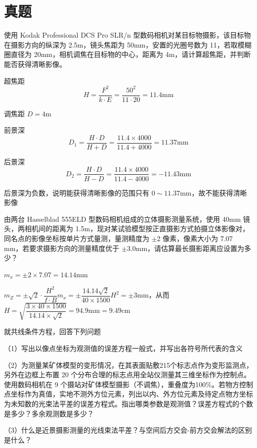 \documentclass[a4paper]{ctexart}
\newtheorem{example}{\hskip 2em 例}
\newtheorem*{sol}{\hskip 2em 解}
\begin{document}
\section*{真题}
\begin{example}
使用 Kodak Professional DCS Pro SLR/n 型数码相机对某目标物摄影，该目标物在摄影方向的纵深为 2.5m，镜头焦距为 50mm，安置的光圈号数为 11，若取模糊圈直径为 20mm，相机调焦在目标物的中心，距离为 4m，请计算超焦距，并判断能否获得清晰影像。
\end{example}
\begin{sol}
超焦距 
$$
H=\frac{F^2}{k\cdot E}=\frac{50^2}{11\cdot 20}=11.4\mathrm{mm}
$$

调焦距 $D=4$m

前景深
$$
D_1=\frac{H\cdot D}{H+D}=\frac{11.4\times 4000}{11.4+4000}=11.37\text{mm}
$$

后景深
$$
D_2=\frac{H\cdot D}{H-D}=\frac{11.4\times 4000}{11.4-4000}=-11.43\text{mm}
$$

后景深为负数，说明能获得清晰影像的范围只有 $0\sim 11.37$mm，故不能获得清晰影像
\end{sol}
\begin{example}
由两台 Hasselblad 555ELD 型数码相机组成的立体摄影测量系统，使用 40mm 镜头，两相机间的距离为 1.5m，现对某试验模型按正直摄影方式拍摄立体影像对，同名点的影像坐标按单片方式量测，量测精度为 $\pm$2 像素，像素大小为 7.07 mm，若要求摄影方向的测量精度优于 $\pm$3.0mm，请估算最长摄影距离应设置为多少？
\end{example}
\begin{sol}
$m_x=\pm 2\times 7.07=14.14$mm

$m_Z=\pm \sqrt{2}\cdot \dfrac{H^2}{f\cdot B}m_x=\pm \dfrac{14.14\sqrt{2}}{40\times 1500}H^2=\pm 3\mathrm{mm}$，从而 $H=\sqrt{\dfrac{3\times 40\times 1500}{14.14\times \sqrt{2}}}=94.9\text{mm}=9.49\text{cm}$
\end{sol}
\begin{example}
\label{ex3}
就共线条件方程，回答下列问题

（1）写出以像点坐标为观测值的误差方程一般式，并写出各符号所代表的含义

（2）为测量某矿体模型的变形情况，在其表面贴敷215个标志点作为变形监测点，另外在边框上布置 20 个分布合理的标志点用全站仪测量其三维坐标作为控制点。使用数码相机在 9 个摄站对矿体模型摄影（不调焦），重叠度为100\%。若物方控制点坐标作为真值，实地不测外方位元素，列出以内、外方位元素及待定点物方坐标为未知数的光束法平差的误差方程式。指出哪类参数是观测值？误差方程式的个数是多少？多余观测数是多少？

（3）什么是近景摄影测量的光线束法平差？与空间后方交会-前方交会解法的区别是什么？
\end{example}
\end{document}
